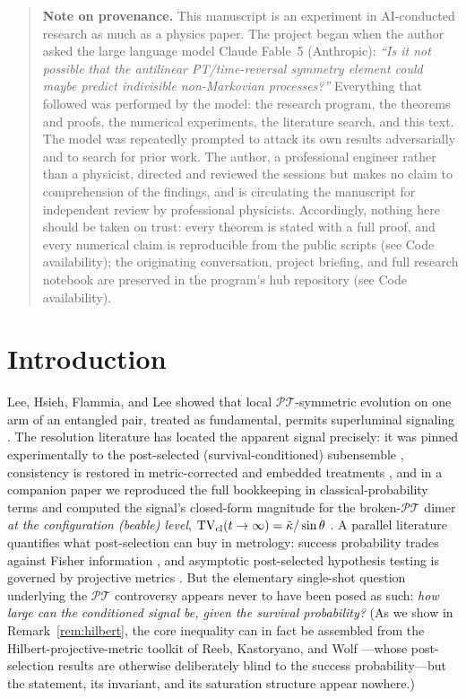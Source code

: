 \documentclass[11pt]{article}
\theoremstyle{remark}
\newcommand{\PT}{\mathcal{PT}}
\newcommand{\TV}{\mathrm{TV}}
\begin{document}
\newpage
\begin{quote}
\small\noindent\textbf{Note on provenance.} This manuscript is an
experiment in AI-conducted research as much as a physics paper. The
project began when the author asked the large language model Claude
Fable~5 (Anthropic): \emph{``Is it not possible that the antilinear
PT/time-reversal symmetry element could maybe predict indivisible
non-Markovian processes?''} Everything that followed was performed by
the model: the research program, the theorems and proofs, the numerical
experiments, the literature search, and this text. The model was
repeatedly prompted to attack its own results adversarially and to
search for prior work. The author, a professional engineer rather than
a physicist, directed and reviewed the sessions but makes no claim to
comprehension of the findings, and is circulating the manuscript for
independent review by professional physicists. Accordingly, nothing
here should be taken on trust: every theorem is stated with a full
proof, and every numerical claim is reproducible from the public
scripts (see Code availability); the originating conversation,
project briefing, and full research notebook are preserved in the
program's hub repository (see Code availability).
\end{quote}

\section{Introduction}
\label{sec:intro}

Lee, Hsieh, Flammia, and Lee showed that local $\PT$-symmetric
evolution on one arm of an entangled pair, treated as fundamental,
permits superluminal signaling \cite{LHFL2014}. The resolution
literature has located the apparent signal precisely: it was pinned
experimentally to the post-selected (survival-conditioned)
subensemble \cite{Tang2016}, consistency is restored in
metric-corrected and embedded treatments \cite{Brody2016,Ju2019},
and in a companion paper we reproduced the full bookkeeping in
classical-probability terms and computed the signal's closed-form
magnitude for the broken-$\PT$ dimer \emph{at the configuration
(beable) level}, $\TV_{\rm cl}(t\to\infty)=\tilde\kappa/\sin\theta$
\cite{instantaneous}. A parallel literature quantifies what
post-selection can buy in metrology: success probability trades
against Fisher information \cite{CFJC2014,AS2020}, and asymptotic
post-selected hypothesis testing is governed by projective metrics
\cite{RKW2011,RLW2022}. But the elementary single-shot question
underlying the $\PT$ controversy appears never to have been posed as
such: \emph{how large can the conditioned signal be, given the
survival probability?} (As we show in
Remark~\ref{rem:hilbert}, the core inequality can in fact be
assembled from the Hilbert-projective-metric toolkit of Reeb,
Kastoryano, and Wolf \cite{RKW2011}---whose post-selection results
are otherwise deliberately blind to the success probability---but
the statement, its invariant, and its saturation structure appear
nowhere.)
\end{document}
